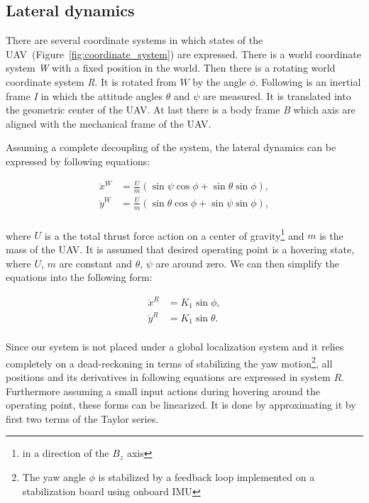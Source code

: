 \subsection{Lateral dynamics}

There are several coordinate systems in which states of the UAV~(Figure~\ref{fig:coordinate_system}) are expressed. There is a world coordinate system \textit{W} with a fixed position in the world. Then there is a rotating world coordinate system \textit{R}. It is rotated from $W$ by the angle $\phi$. Following is an inertial frame \textit{I} in which the attitude angles $\theta$ and $\psi$ are measured. It is translated into the geometric center of the UAV. At last there is a body frame \textit{B} which axis are aligned with the mechanical frame of the UAV.

Assuming a complete decoupling of the system, the lateral dynamics can be expressed by following equations:

\begin{equation}
\begin{split}
\ddot{x}^W &= \frac{U}{m}\left(\sin\psi\cos\phi + \sin\theta\sin\phi\right),\\
\ddot{y}^W &= \frac{U}{m}\left(\sin\theta\cos\phi + \sin\psi\sin\phi\right),\\
\end{split}
\end{equation}

where $U$ is a the total thrust force action on a center of gravity\footnote{in a direction of the $B_z$ axis} and $m$ is the mass of the UAV. It is assumed that desired operating point is a hovering state, where $U$, $m$ are constant and $\theta$, $\psi$ are around zero. We can then simplify the equations into the following form:

\begin{equation}
\begin{split}
\ddot{x}^R &= K_1\sin \phi,\\
\ddot{y}^R &= K_1\sin \theta.\\
\end{split}
\label{eq:attitude_first_lin}
\end{equation}

Since our system is not placed under a global localization system and it relies completely on a dead-reckoning in terms of stabilizing the yaw motion\footnote{The yaw angle $\phi$ is stabilized by a feedback loop implemented on a stabilization board using onboard IMU}, all positions and its derivatives in following equations are expressed in system $R$. Furthermore assuming a small input actions during hovering around the operating point, these forms can be linearized. It is done by approximating it by first two terms of the Taylor series.

